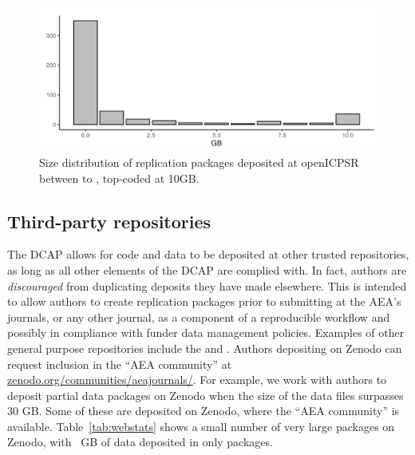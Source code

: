 \begin{figure}[t]
    \centering
    \includegraphics[width=\textwidth]{images/plot_filesize_dist.png} 
    \caption{Size distribution of replication packages deposited at openICPSR between  \firstday{} to \lastday{}, top-coded at 10GB.}
    \label{fig:size_packages}
\end{figure}


\subsection{Third-party repositories}

The \ac{DCAP} allows for code and data  to be deposited at other trusted repositories, as long as all other elements of the \ac{DCAP} are complied with. In fact, authors are \textit{discouraged} from duplicating deposits they have made elsewhere. This is intended to allow authors to create replication packages prior to submitting at the AEA's journals, or any other journal, as a component of a reproducible workflow and possibly in compliance with funder data management policies. Examples of other general purpose repositories include the  and . Authors depositing on Zenodo can request inclusion in the  ``AEA community'' at \href{https://zenodo.org/communities/aeajournals/}{zenodo.org/communities/aeajournals/}. For example, we work with authors to deposit  partial data packages on Zenodo when the size of the data files surpasses 30 GB. Some of these are deposited on Zenodo, where the  ``AEA community'' is available. Table~\ref{tab:webstats} shows a small number of very large packages on Zenodo, with \zenodototalSizeGB{}~GB of data  deposited in only \zenodototalPublished{} packages. 


